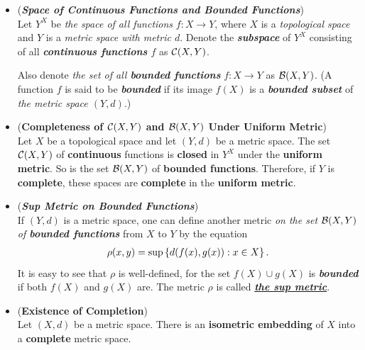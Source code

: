 \documentclass[11pt]{article}
\begin{document}
\begin{itemize}
\item \begin{definition} (\emph{\textbf{Space of Continuous Functions and Bounded Functions}})\\
Let $Y^{X}$ be  \emph{the space of all functions} $f: X \rightarrow Y$, where $X$ is a \emph{topological space} and $Y$ is a \emph{metric space with metric $d$}. Denote the \emph{\textbf{subspace}}  of $Y^X$ consisting of all \emph{\textbf{continuous functions} $f$} as ${\mathcal C}(X, Y)$. 

Also denote \emph{the set  of all \textbf{bounded functions}} $f: X \rightarrow Y$ as ${\mathcal B}(X, Y)$. (A function $f$ is said to be \emph{\textbf{bounded}} if its image $f(X)$ is a \emph{\textbf{bounded subset}} of \emph{the metric space $(Y, d)$}.) 
\end{definition}

\item \begin{proposition}  (\textbf{Completeness of ${\mathcal C}(X, Y)$ and   ${\mathcal B}(X, Y)$  Under Uniform Metric}) \citep{munkres2000topology} \\
Let $X$ be a topological space and let $(Y, d)$ be a metric space. The set ${\mathcal C}(X, Y)$ of \textbf{continuous} functions is \textbf{closed} in $Y^X$ under the \textbf{uniform metric}. So is the set ${\mathcal B}(X, Y)$ of \textbf{bounded functions}. Therefore, if $Y$ is \textbf{complete}, these spaces are \textbf{complete} in the \textbf{uniform metric}.
\end{proposition}

\item \begin{definition} (\emph{\textbf{Sup Metric on Bounded Functions}})\\
If $(Y, d)$ is a metric space, one can define another metric \emph{on the set ${\mathcal B}(X, Y)$ of \textbf{bounded functions}} from $X$ to $Y$ by the equation
\begin{align*}
\rho(x, y) = \sup\left\{d(f(x), g(x)): x \in X\right\}.
\end{align*}
It is easy to see that $\rho$ is well-defined, for the set $f(X) \cup g(X)$ is \emph{\textbf{bounded}} if both $f(X)$ and $g(X)$ are. The metric $\rho$ is called \underline{\emph{\textbf{the sup metric}}}.
\end{definition}

\item \begin{theorem} (\textbf{Existence of Completion}) \citep{munkres2000topology}\\
Let $(X, d)$ be a metric space. There is an \textbf{isometric embedding} of $X$ into a \textbf{complete} metric space.
\end{theorem}


\end{itemize}
\end{document}
